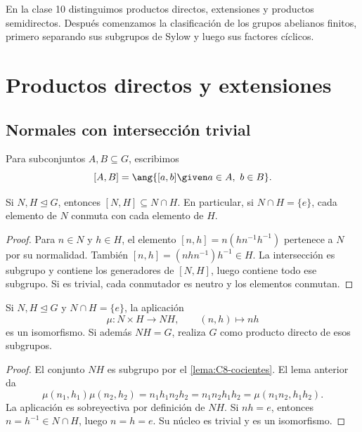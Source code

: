 En la clase 10 distinguimos productos directos, extensiones y productos semidirectos. Después comenzamos la clasificación de los grupos abelianos finitos, primero separando sus subgrupos de Sylow y luego sus factores cíclicos.

\section{Productos directos y extensiones}
\subsection{Normales con intersección trivial}
Para subconjuntos $A,B\subseteq G$, escribimos
\[
[A,B]=\ang{[a,b]\given a\in A,\ b\in B}.
\]
\begin{lema}\label{lema:C10-conmutan}
Si $N,H\trianglelefteq G$, entonces $[N,H]\subseteq N\cap H$. En particular, si $N\cap H=\{e\}$, cada elemento de $N$ conmuta con cada elemento de $H$.
\end{lema}
\begin{proof}
Para $n\in N$ y $h\in H$, el elemento $[n,h]=n(hn^{-1}h^{-1})$ pertenece a $N$ por su normalidad. También $[n,h]=(nhn^{-1})h^{-1}\in H$. La intersección es subgrupo y contiene los generadores de $[N,H]$, luego contiene todo ese subgrupo. Si es trivial, cada conmutador es neutro y los elementos conmutan.
\end{proof}

\begin{prop}\label{prop:C10-directo}
Si $N,H\trianglelefteq G$ y $N\cap H=\{e\}$, la aplicación
\[
\mu:N\times H\longrightarrow NH,\qquad (n,h)\longmapsto nh
\]
es un isomorfismo. Si además $NH=G$, realiza $G$ como producto directo de esos subgrupos.
\end{prop}
\begin{proof}
El conjunto $NH$ es subgrupo por el \cref{lema:C8-cocientes}. El lema anterior da
\[
\mu(n_1,h_1)\mu(n_2,h_2)=n_1h_1n_2h_2
=n_1n_2h_1h_2=\mu(n_1n_2,h_1h_2).
\]
La aplicación es sobreyectiva por definición de $NH$. Si $nh=e$, entonces $n=h^{-1}\in N\cap H$, luego $n=h=e$. Su núcleo es trivial y es un isomorfismo.
\end{proof}

